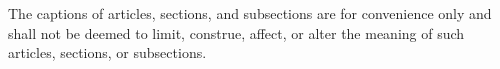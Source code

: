 The captions of articles, sections, and subsections are for convenience only and shall not be deemed to limit, construe, affect, or alter the meaning of such articles, sections, or subsections.
